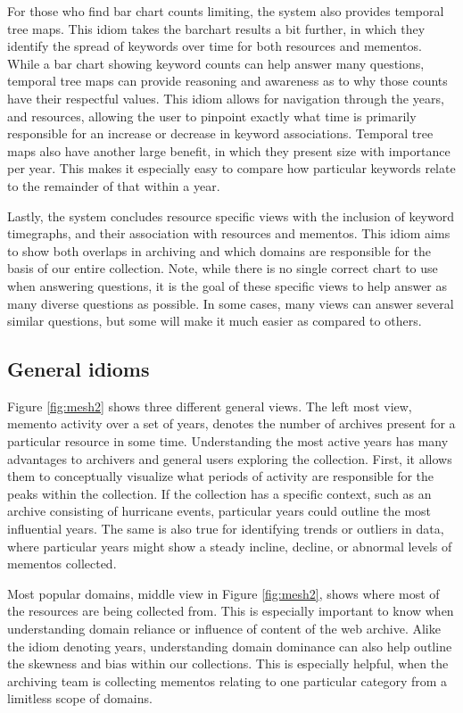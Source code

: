 \documentclass[10pt,journal,compsoc]{IEEEtran}
\begin{document}
For those who find bar chart counts limiting, the system also provides temporal tree maps. This idiom takes the barchart results a bit further, in which they identify the spread of keywords over time for both resources and mementos. While a bar chart showing keyword counts can help answer many questions, temporal tree maps can provide reasoning and awareness as to why those counts have their respectful values. This idiom allows for navigation through the years, and resources, allowing the user to pinpoint exactly what time is primarily responsible for an increase or decrease in keyword associations. Temporal tree maps also have another large benefit, in which they present size with importance per year. This makes it especially easy to compare how particular keywords relate to the remainder of that within a year. \par

Lastly, the system concludes resource specific views with the inclusion of keyword timegraphs, and their association with resources and mementos. This idiom aims to show both overlaps in archiving and which domains are responsible for the basis of our entire collection. Note, while there is no single correct chart to use when answering questions, it is the goal of these specific views to help answer as many diverse questions as possible. In some cases, many views can answer several similar questions, but some will make it much easier as compared to others. \par

\subsection{General idioms}
Figure \ref{fig:mesh2} shows three different general views. The left most view, memento activity over a set of years, denotes the number of archives present for a particular resource in some time. Understanding the most active years has many advantages to archivers and general users exploring the collection. First, it allows them to conceptually visualize what periods of activity are responsible for the peaks within the collection. If the collection has a specific context, such as an archive consisting of hurricane events, particular years could outline the most influential years. The same is also true for identifying trends or outliers in data, where particular years might show a steady incline, decline, or abnormal levels of mementos collected. \par

Most popular domains, middle view in Figure \ref{fig:mesh2}, shows where most of the resources are being collected from. This is especially important to know when understanding domain reliance or influence of content of the web archive. Alike the idiom denoting years, understanding domain dominance can also help outline the skewness and bias within our collections. This is especially helpful, when the archiving team is collecting mementos relating to one particular category from a limitless scope of domains. \par
\end{document}
